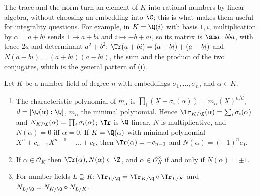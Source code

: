 The trace and the norm turn an element of $K$ into rational numbers by linear algebra, without choosing an embedding into $\C$; this is what makes them
useful for integrality questions. For example, in $K=\Q(i)$ with basis $1,i$, multiplication by $\alpha=a+bi$ sends $1\mapsto a+bi$ and $i\mapsto-b+ai$, so its
matrix is $\sm a{-b}ba$, with trace $2a$ and determinant $a^2+b^2$: $\Tr(a+bi)=(a+bi)+(a-bi)$ and $N(a+bi)=(a+bi)(a-bi)$, the sum and the product of the two
conjugates, which is the general pattern of (i).

\begin{proposition}\label{prop:ant:tracenorm}
Let $K$ be a number field of degree $n$ with embeddings $\sigma_1,\dots,\sigma_n$, and $\alpha\in K$.
\begin{enumerate}[label=(\roman*)]
\item The characteristic polynomial of $m_\alpha$ is $\prod_i(X-\sigma_i(\alpha))=m_\alpha(X)^{n/d}$, $d=[\Q(\alpha):\Q]$, $m_\alpha$ the minimal
polynomial. Hence $\Tr_{K/\Q}(\alpha)=\sum_i\sigma_i(\alpha)$ and $N_{K/\Q}(\alpha)=\prod_i\sigma_i(\alpha)$; $\Tr$ is $\Q$-linear, $N$ is
multiplicative, and $N(\alpha)=0$ iff $\alpha=0$. If $K=\Q(\alpha)$ with minimal polynomial $X^n+c_{n-1}X^{n-1}+\dots+c_0$, then
$\Tr(\alpha)=-c_{n-1}$ and $N(\alpha)=(-1)^nc_0$.
\item If $\alpha\in\mathcal O_K$ then $\Tr(\alpha),N(\alpha)\in\Z$, and $\alpha\in\mathcal O_K^\times$ if and only if $N(\alpha)=\pm1$.
\item For number fields $L\supseteq K$: $\Tr_{L/\Q}=\Tr_{K/\Q}\circ\Tr_{L/K}$ and $N_{L/\Q}=N_{K/\Q}\circ N_{L/K}$.
\end{enumerate}
\end{proposition}

